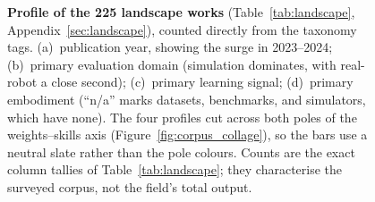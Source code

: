 \PassOptionsToPackage{svgnames,dvipsnames}{xcolor} \documentclass[acmsmall,screen,nonacm]{acmart}
\begin{document}
\begin{figure}[tp]
\begin{tabular}{@{}c@{\hspace{7mm}}c@{}}
\end{tabular}
\caption{\textbf{Profile of the 225 landscape works} (Table~\ref{tab:landscape},
Appendix~\ref{sec:landscape}), counted directly from the taxonomy tags. (a)~publication year, showing the surge in 2023--2024; (b)~primary
evaluation domain (simulation dominates, with real-robot a close second); (c)~primary learning
signal; (d)~primary embodiment (``n/a'' marks datasets, benchmarks, and simulators, which have
none). The four profiles cut across both poles of the weights--skills axis
(Figure~\ref{fig:corpus_collage}), so the bars use a neutral slate rather than the pole colours.
Counts are the exact column tallies of Table~\ref{tab:landscape}; they characterise the
surveyed corpus, not the field's total output.}
\label{fig:corpus_dist}
\end{figure}
\end{document}
